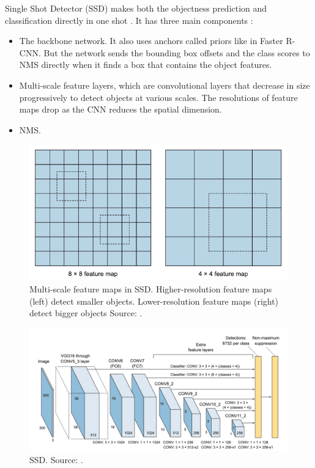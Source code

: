 \documentclass[a4paper, 11pt, oneside]{article}
\begin{document}
Single Shot Detector (SSD) makes both the objectness prediction and classification directly in one shot
\cite{elgendy2020deep, liu2016ssd}. It has three main components \cite{elgendy2020deep, liu2016ssd}:

\begin{itemize}
  \item The backbone network. It also uses anchors called priors like in Faster R-CNN. But the network sends the bounding
  box offsets and the class scores to NMS directly when it finds a box that contains the object features.
  \item Multi-scale feature layers, which are convolutional layers that decrease in size progressively to detect objects
  at various scales. The resolutions of feature maps drop as the CNN reduces the spatial dimension.
  \item NMS.
\end{itemize}

\begin{figure}[ht]
  \begin{center}
    \includegraphics[width=.8\textwidth]{ssd_feature_maps.png}
  \end{center}
  \caption{Multi-scale feature maps in SSD. Higher-resolution feature maps (left) detect smaller objects.
  Lower-resolution feature maps (right) detect bigger objects Source: \cite{elgendy2020deep}.}
\end{figure}

\begin{figure}[ht]
  \begin{center}
    \includegraphics[width=.8\textwidth]{ssd.png}
  \end{center}
  \caption{SSD. Source: \cite{elgendy2020deep}.}
\end{figure}
\end{document}
